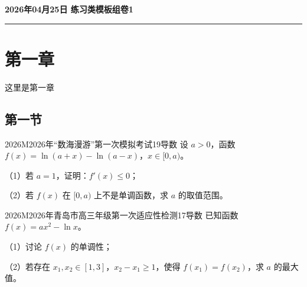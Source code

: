 \documentclass[12pt,UTF-8,a4paper]{ctexart}
\newcommand{\mytitle}{}
\numberwithin{figure}{section}
\theoremstyle{mystyle}
\theoremstyle{mystylekaishu}
\theoremstyle{mystyle}
\renewcommand{\ge}{\geqslant}
\renewcommand{\leq}{\leqslant}
\numberwithin{xiti}{section}
\begin{document}
\thispagestyle{plain} %
\renewcommand{\mytitle}{2026年04月25日 练习类模板组卷1}

\begin{center}
  {\Huge\bfseries\color{structure} \mytitle}
  \vspace{0.5em}
  
  \textcolor{structure}{\rule{\linewidth}{1.5pt}}
\end{center}
\vspace{1em}

\section{第一章}

这里是第一章

\subsection{第一节}


\begin{problem}{2026}{M}{2026年“数海漫游”第一次模拟考试}{19}{导数}
设 $a>0$，函数 $f(x)=\ln(a+x)-\ln(a-x)$，$x\in[0,a)$。

（1）若 $a=1$，证明：$f'(x)\leq0$；

（2）若 $f(x)$ 在 $[0,a)$ 上不是单调函数，求 $a$ 的取值范围。
\end{problem}


\begin{problem}{2026}{M}{2026年青岛市高三年级第一次适应性检测}{17}{导数}
已知函数 $f(x)=ax^2-\ln x$。

（1）讨论 $f(x)$ 的单调性；

（2）若存在 $x_1,x_2\in[1,3]$，$x_2-x_1\ge1$，使得 $f(x_1)=f(x_2)$，求 $a$ 的最大值。
\end{problem}
\end{document}
